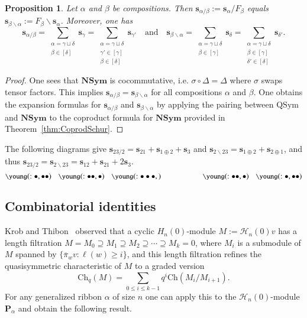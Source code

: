 \documentclass{amsart}
\newtheorem{proposition}[theorem]{Proposition}
\newtheorem*{Young's Rule}{Young's Rule}
\theoremstyle{definition}
\theoremstyle{remark}
\numberwithin{equation}{section}
\begin{document}
\begin{proposition}
Let $\alpha$ and $\beta$ be compositions. Then ${{\mathbf s}}_{\alpha/\beta}:= {{\mathbf s}}_\alpha / F_\beta$ equals ${{\mathbf s}}_{\beta\backslash\alpha}:= F_\beta\backslash{{\mathbf s}}_\alpha$. Moreover, one has
\[ {{\mathbf s}}_{\alpha/\beta} = 
\sum_{\substack{\alpha=\gamma\sqcup\delta \\ \beta\in[\delta]}} {{\mathbf s}}_\gamma 
= \sum_{\substack{\alpha=\gamma\sqcup\delta \\ \gamma'\in[\gamma] \\ \beta\in[\delta]}} {{\mathbf s}}_{\gamma'}
{\quad\text{and}\quad} {{\mathbf s}}_{\beta\backslash\alpha} = 
\sum_{\substack{\alpha=\gamma\sqcup\delta\\ \beta\in[\gamma]}} {{\mathbf s}}_\delta
= \sum_{\substack{\alpha=\gamma\sqcup\delta\\ \beta\in[\gamma] \\ \delta'\in[\delta]}} {{\mathbf s}}_{\delta'}. \]
\end{proposition}

\begin{proof}
One sees that ${\mathbf{NSym}}$ is cocommutative, i.e. $\sigma\circ\Delta=\Delta$ where $\sigma$ swaps tensor factors. This implies ${{\mathbf s}}_{\alpha/\beta} = {{\mathbf s}}_{\beta\backslash\alpha}$ for all compositions $\alpha$ and $\beta$. One obtains the expansion formulas for ${{\mathbf s}}_{\alpha/\beta}$ and ${{\mathbf s}}_{\beta\backslash\alpha}$ by applying the pairing between ${\mathrm{QSym}}$ and ${\mathbf{NSym}}$ to the coproduct formula for ${\mathbf{NSym}}$ provided in Theorem~\ref{thm:CoprodSchur}.
\end{proof}

The following diagrams give ${{\mathbf s}}_{23/2}={{\mathbf s}}_{21}+{{\mathbf s}}_{1\oplus2}+{{\mathbf s}}_{3}$ and  ${{\mathbf s}}_{2\backslash 23}={{\mathbf s}}_{1\oplus2}+{{\mathbf s}}_{2\oplus1}$, and thus ${{\mathbf s}}_{23/2} = {{\mathbf s}}_{2\backslash 23} ={{\mathbf s}}_{12}+{{\mathbf s}}_{21}+2{{\mathbf s}}_3$.
\[
\small \young(:\bullet\hfill\hfill,\bullet\bullet) \quad \young(:\bullet\bullet\hfill,\bullet\hfill)\quad \young(:\bullet\bullet\bullet,\hfill\hfill)
\qquad\qquad\qquad
\small \young(:\hfill\bullet\bullet,\hfill\bullet)\quad \young(:\hfill\hfill\bullet,\bullet\bullet)
\]

\subsection{Combinatorial identities}
Krob and Thibon~\cite{KrobThibon} observed that a cyclic $H_n(0)$-module $M:={\mathcal{H}}_n(0) v$ has a length filtration $M=M_0\supseteq M_1\supseteq M_2\supseteq \cdots \supseteq M_k=0$, where $M_i$ is a submodule of $M$ spanned by $\{{\overline{\pi}}_w v:\ell(w)\ge i\}$, and this length filtration refines the quasisymmetric characteristic of $M$ to a graded version
\[ \mathrm{Ch}_q(M)=\sum_{0\le i\le k-1} q^i \mathrm{Ch}\left(M_i/M_{i+1}\right). \]
For any generalized ribbon $\alpha$ of size $n$ one can apply this to the ${\mathcal{H}}_n(0)$-module ${\mathbf{P}}_\alpha$ and obtain the following result.
\end{document}
